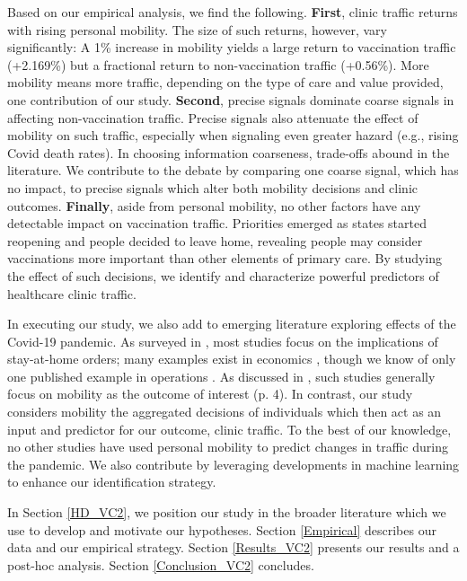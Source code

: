  Based on our empirical analysis, we find the following. \textbf{First}, clinic traffic returns with rising personal mobility. The size of such returns, however, vary significantly: A 1\% increase in mobility yields a large return to vaccination traffic (+2.169\%) but a fractional return to non-vaccination traffic (+0.56\%). More mobility means more traffic, depending on the type of care and value provided, one contribution of our study. \textbf{Second}, precise signals dominate coarse signals in affecting non-vaccination traffic. Precise signals also attenuate the effect of mobility on such traffic, especially when signaling even greater hazard (e.g., rising Covid death rates). In choosing information coarseness, trade-offs abound in the literature. We contribute to the debate by comparing one coarse signal, which has no impact, to precise signals which alter both mobility decisions and clinic outcomes. \textbf{Finally}, aside from personal mobility, no other factors have any detectable impact on vaccination traffic. Priorities emerged as states started reopening and people decided to leave home, revealing people may consider vaccinations more important than other elements of primary care. By studying the effect of such decisions, we identify and characterize powerful predictors of healthcare clinic traffic.

 In executing our study, we also add to emerging literature exploring effects of the Covid-19 pandemic. As surveyed in \cite{Gupta2020a}, most studies focus on the implications of stay-at-home orders; many examples exist in economics \citep[e.g.,][]{Goolsbee2020_key,Goolsbee2020_unpub,Alfaro2020,Cantor2020,Alfaro2021,Ziedan2020,Farboodi2020,Zhang2020}, though we know of only one published example in operations \citep{Wang2021}. As discussed in \cite{Wang2021}, such studies generally focus on mobility as the outcome of interest (p. 4). In contrast, our study considers mobility the aggregated decisions of individuals which then act as an input and predictor for our outcome, clinic traffic. To the best of our knowledge, no other studies have used personal mobility to predict changes in traffic during the pandemic. We also contribute by leveraging developments in machine learning to enhance our identification strategy.
 
 In Section \ref{HD_VC2}, we position our study in the broader literature which we use to develop and motivate our hypotheses. Section \ref{Empirical} describes our data and our empirical strategy. Section \ref{Results_VC2} presents our results and a post-hoc analysis. Section \ref{Conclusion_VC2} concludes.
 


